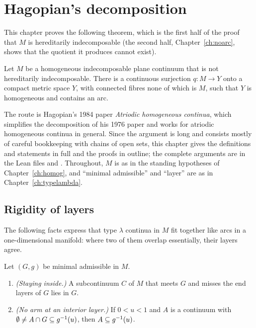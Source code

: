 \chapter{Hagopian's decomposition}\label{ch:decomp}

This chapter proves the following theorem, which is the first half of the proof that $M$ is hereditarily
indecomposable (the second half, Chapter~\ref{ch:noarc}, shows that the quotient it produces cannot exist).

\begin{theorem}[Hagopian 1984, Theorem~1, with $N=M$]\label{thm:h84}
Let $M$ be a homogeneous indecomposable plane continuum that is not hereditarily indecomposable. There is a
continuous surjection $q\colon M\to Y$ onto a compact metric space $Y$, with connected fibres none of which is $M$,
such that $Y$ is homogeneous and contains an arc.
\end{theorem}


The route is Hagopian's 1984 paper \emph{Atriodic homogeneous continua}, which simplifies the decomposition of his
1976 paper and works for atriodic homogeneous continua in general. Since the argument is long and consists mostly of
careful bookkeeping with chains of open sets, this chapter gives the definitions and statements in full and the proofs
in outline; the complete arguments are in the Lean files  and
. Throughout, $M$ is as in the standing hypotheses of Chapter~\ref{ch:homog},
and ``minimal admissible'' and ``layer'' are as in Chapter~\ref{ch:typelambda}.

\section{Rigidity of layers}

The following facts express that type $\lambda$ continua in $M$ fit together like arcs in a one-dimensional
manifold: where two of them overlap essentially, their layers agree.

\begin{lemma}\label{lem:rigid}
Let $(G,g)$ be minimal admissible in $M$.
\begin{enumerate}[label=(\alph*)]
\item \emph{(Staying inside.)} A subcontinuum $C$ of $M$ that meets $G$ and misses the end layers of $G$ lies in $G$.
\item \emph{(No arm at an interior layer.)} If $0<u<1$ and $A$ is a continuum with $\emptyset\ne A\cap G\subseteq g^{-1}(u)$, then
$A\subseteq g^{-1}(u)$.
\end{enumerate}
\end{lemma}

